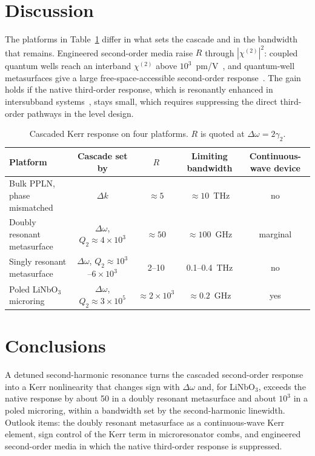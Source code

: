 \documentclass[aps,prapplied,onecolumn,superscriptaddress,longbibliography,nofootinbib]{revtex4-2}
\newcommand{\chitwo}{\chi^{(2)}}
\newcommand{\Dom}{\Delta\omega}
\begin{document}
\section{Discussion}\label{sec:discussion}

The platforms in Table~\ref{tab:platforms} differ in what sets the
cascade and in the bandwidth that remains.  Engineered second-order media
raise $R$ through $|\chitwo|^2$: coupled quantum wells reach an interband
$\chitwo$ above $10^3$~pm/V~\cite{ramesh2026}, and quantum-well
metasurfaces give a large free-space-accessible second-order
response~\cite{fathi2026}.  The gain holds if the native third-order
response, which is resonantly enhanced in intersubband
systems~\cite{sirtori1992}, stays small, which requires suppressing the
direct third-order pathways in the level design.

\begin{table}[t]
  \caption{Cascaded Kerr response on four platforms.  $R$ is quoted at
    $\Dom=2\gamma_2$.}
  \label{tab:platforms}
  \begin{ruledtabular}
  \begin{tabular}{lcccc}
    Platform & Cascade set by & $R$ & Limiting bandwidth & Continuous-wave device \\
    \hline
    Bulk PPLN, phase mismatched & $\Delta k$ & $\approx5$ & $\approx10$~THz & no \\
    Doubly resonant metasurface & $\Dom$, $Q_2\approx4\times10^3$ & $\approx50$ & $\approx100$~GHz & marginal \\
    Singly resonant metasurface & $\Dom$, $Q_2\approx10^3$--$6\times10^3$ & 2--10 & 0.1--0.4~THz & no \\
    Poled LiNbO$_3$ microring & $\Dom$, $Q_2\approx3\times10^5$ & $\approx2\times10^3$ & $\approx0.2$~GHz & yes \\
  \end{tabular}
  \end{ruledtabular}
\end{table}

\section{Conclusions}

A detuned second-harmonic resonance turns the cascaded second-order
response into a Kerr nonlinearity that changes sign with $\Dom$ and, for
LiNbO$_3$, exceeds the native response by about 50 in a doubly resonant
metasurface and about $10^3$ in a poled microring, within a bandwidth set
by the second-harmonic linewidth.  Outlook items: the doubly resonant
metasurface as a continuous-wave Kerr element, sign control of the Kerr
term in microresonator combs, and engineered second-order media in which
the native third-order response is suppressed.
\end{document}
